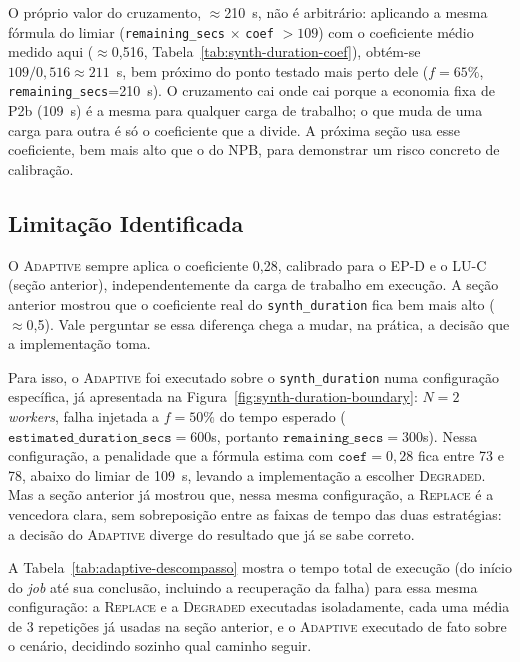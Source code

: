 O próprio valor do cruzamento, $\approx$210~s, não é arbitrário: aplicando a mesma
fórmula do limiar (\texttt{remaining\_secs} $\times$ \texttt{coef} $> 109$) com o
coeficiente médio medido aqui ($\approx$0,516, Tabela~\ref{tab:synth-duration-coef}),
obtém-se $109/0,516 \approx 211$~s, bem próximo do ponto testado mais perto dele
($f=65\%$, \texttt{remaining\_secs}=210~s). O cruzamento cai onde cai porque a
economia fixa de P2b (109~s) é a mesma para qualquer carga de trabalho; o que muda
de uma carga para outra é só o coeficiente que a divide. A próxima seção usa esse
coeficiente, bem mais alto que o do NPB, para demonstrar um risco concreto de
calibração.

\subsection{Limitação Identificada}
\label{sec:adaptive-limitacao}

O \textsc{Adaptive} sempre aplica o coeficiente 0,28, calibrado para o EP-D e o
LU-C (seção anterior), independentemente da carga de trabalho em execução. A seção
anterior mostrou que o coeficiente real do \texttt{synth\_duration} fica bem mais
alto ($\approx$0,5). Vale perguntar se essa diferença chega a mudar, na prática, a
decisão que a implementação toma.

Para isso, o \textsc{Adaptive} foi executado sobre o \texttt{synth\_duration} numa
configuração específica, já apresentada na Figura~\ref{fig:synth-duration-boundary}:
$N=2$ \textit{workers}, falha injetada a $f=50\%$ do tempo esperado
($\texttt{estimated\_duration\_secs}=600$s, portanto $\texttt{remaining\_secs}=300$s).
Nessa configuração, a penalidade que a fórmula estima com $\texttt{coef}=0,28$ fica
entre 73 e 78, abaixo do limiar de 109~s, levando a implementação a escolher
\textsc{Degraded}. Mas a seção anterior já mostrou que, nessa mesma configuração, a
\textsc{Replace} é a vencedora clara, sem sobreposição entre as faixas de tempo das
duas estratégias: a decisão do \textsc{Adaptive} diverge do resultado que já se sabe
correto.

A Tabela~\ref{tab:adaptive-descompasso} mostra o tempo total de execução (do início
do \textit{job} até sua conclusão, incluindo a recuperação da falha) para essa
mesma configuração: a \textsc{Replace} e a \textsc{Degraded} executadas
isoladamente, cada uma média de 3 repetições já usadas na seção anterior, e o
\textsc{Adaptive} executado de fato sobre o cenário, decidindo sozinho qual
caminho seguir.

